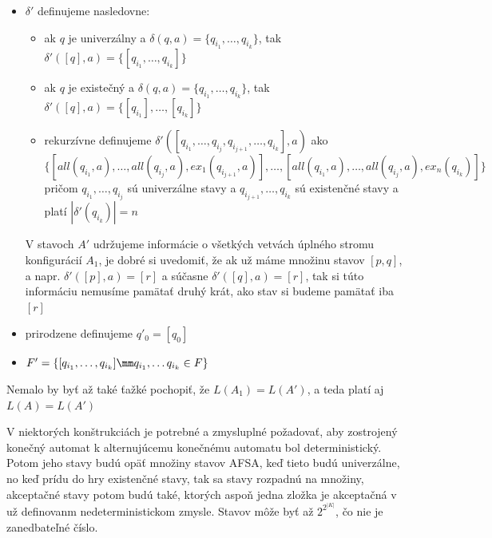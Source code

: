 \begin{dokaz}
\begin{itemize}
\item $\delta'$ definujeme nasledovne:
\begin{itemize}
\item ak $q$ je univerzálny a $\delta(q,a)=\{q_{i_1},\dots,q_{i_k}\}$, tak
$\delta'([q],a)=\{[q_{i_1},\dots,q_{i_k}]\}$
\item ak $q$ je existečný a $\delta(q,a)=\{q_{i_1},\dots,q_{i_k}\}$, tak
$\delta'([q],a)=\{[q_{i_1}],\dots,[q_{i_k}]\}$
\item rekurzívne definujeme
$\delta'([q_{i_1},\dots,q_{i_j},q_{i_{j+1}}, \dots,q_{i_k}],a)$
ako\\ $\{[all(q_{i_1},a),
\dots,all(q_{i_j},a),ex_1(q_{i_{j+1}},a)],
\dots,[all(q_{i_1},a),\dots,all(q_{i_j},a),ex_n(q_{i_k})]\}$\\
pri\-čom $q_{i_1},\dots,q_{i_j}$ sú univerzálne stavy a
$q_{i_{j+1}},\dots,q_{i_k}$ sú existenčné stavy a platí
$|\delta'(q_{i_k})|=n$
\end{itemize}
V stavoch $A'$ udržujeme informácie o všetkých vetvách úplného
stromu konfigurácií $A_1$, je dobré si uvedomiť, že ak už máme
množinu stavov $[p,q]$, a napr. $\delta'([p],a)=[r]$ a súčasne
$\delta'([q],a)=[r]$, tak si túto informáciu nemusíme pamätať
druhý krát, ako stav si budeme pamätať iba $[r]$
\item prirodzene definujeme $q'_0=[q_0]$
\item $F'=\{[q_{i_1},\dots,q_{i_k}]\mm q_{i_1},\dots q_{i_k}\in F\}$
\end{itemize}
Nemalo by byť až také ťažké pochopiť, že $L(A_1)=L(A')$, a teda
platí aj $L(A)=L(A')$
\end{dokaz}

V niektorých konštrukciách je potrebné a zmysluplné požadovať, aby
zostrojený konečný automat k alternujúcemu konečnému automatu bol
deterministický. Potom jeho stavy budú opäť množiny stavov AFSA,
keď tieto budú univerzálne, no keď prídu do hry exis\-ten\-čné
stavy, tak sa stavy rozpadnú na množiny, akceptačné stavy potom
budú také, ktorých aspoň jedna zložka je akceptačná v už
definovanm nedeterministickom zmysle. Stavov môže byť až
$2^{2^{|K|}}$, čo nie je zanedbateľné číslo.


